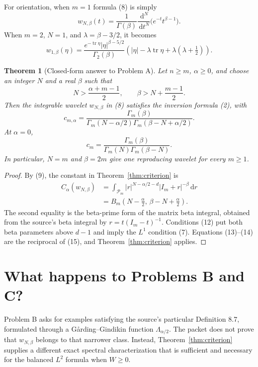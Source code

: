 \documentclass[11pt]{article}
\newtheorem{theorem}{Theorem}
\theoremstyle{remark}
\newcommand{\Pm}{\mathcal P_m}
\newcommand{\tr}{\operatorname{tr}}
\newcommand{\dd}{\,\mathrm d}
\newcommand{\Id}{I_m}
\begin{document}
For orientation, when $m=1$ formula (8) is simply
\[
 w_{N,\beta}(t)=\frac1{\Gamma(\beta)}
 \frac{\dd^N}{\dd t^N}\bigl(e^{-t}t^{\beta-1}\bigr).
\]
When $m=2$, $N=1$, and $\lambda=\beta-3/2$, it becomes
\[
 w_{1,\beta}(\eta)=\frac{e^{-\tr\eta}|\eta|^{\beta-5/2}}
 {\Gamma_2(\beta)}
 \left(|\eta|-\lambda\tr\eta+\lambda(\lambda+\tfrac12)\right).
\]

\begin{theorem}[Closed-form answer to Problem A]\label{thm:explicit}
Let $n\geq m$, $\alpha\geq0$, and choose an integer $N$ and a real $\beta$
such that
\[
 N>\frac{\alpha+m-1}{2},\qquad
 \beta>N+\frac{m-1}{2}.                                         \tag{12}
\]
Then the integrable wavelet $w_{N,\beta}$ in (8) satisfies the inversion
formula (2), with
\[
 \boxed{\quad
 c_{m,\alpha}=
 \frac{\Gamma_m(\beta)}
 {\Gamma_m(N-\alpha/2)\Gamma_m(\beta-N+\alpha/2)}.
 \quad}                                                          \tag{13}
\]
At $\alpha=0$,
\[
 c_m=\frac{\Gamma_m(\beta)}{\Gamma_m(N)\Gamma_m(\beta-N)}.      \tag{14}
\]
In particular, $N=m$ and $\beta=2m$ give one reproducing wavelet for every
$m\geq1$.
\end{theorem}

\begin{proof}
By (9), the constant in Theorem~\ref{thm:criterion} is
\begin{align*}
 C_\alpha(w_{N,\beta})
 &=\int_{\Pm}|r|^{N-\alpha/2-d}|\Id+r|^{-\beta}\dd r\\
 &=B_m\left(N-\frac\alpha2,\,\beta-N+\frac\alpha2\right).       \tag{15}
\end{align*}
The second equality is the beta-prime form of the matrix beta integral,
obtained from the source's beta integral by
$r=t(\Id-t)^{-1}$.  Conditions (12) put both beta parameters above $d-1$
and imply the $L^1$ condition (7).  Equations (13)--(14) are the reciprocal
of (15), and Theorem~\ref{thm:criterion} applies.
\end{proof}

\section{What happens to Problems B and C?}

Problem B asks for examples satisfying the source's particular Definition
8.7, formulated through a Gårding--Gindikin function
$\Lambda_{\alpha/2}$.  The packet does not prove that
$w_{N,\beta}$ belongs to that narrower class.  Instead,
Theorem~\ref{thm:criterion} supplies a different exact spectral
characterization that is sufficient and necessary for the balanced $L^2$
formula when $W\geq0$.
\end{document}
